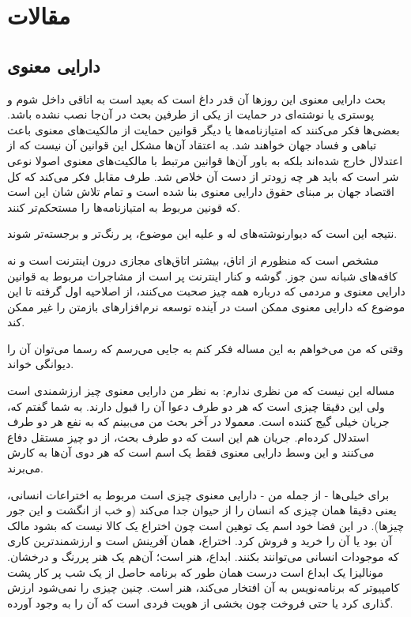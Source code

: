 \chapter{مقالات}
\section{دارایی معنوی}
بحث دارایی معنوی این روزها آن قدر داغ است که بعید است به اتاقی داخل
شوم و پوستری یا نوشته‌ای در حمایت از یکی از طرفین بحث در آن‌جا نصب نشده
باشد. بعضی‌ها فکر می‌کنند که امتیازنامه‌ها یا دیگر قوانین حمایت از
مالکیت‌های معنوی باعث تباهی و فساد جهان خواهند شد. به اعتقاد آن‌ها مشکل
این قوانین آن نیست که از اعتدلال خارج شده‌اند بلکه به باور آن‌ها قوانین
مرتبط با مالکیت‌های معنوی اصولا نوعی شر است که باید هر چه زودتر از دست
آن خلاص شد. طرف مقابل فکر می‌کند که کل اقتصاد جهان بر مبنای حقوق دارایی
معنوی بنا شده است و تمام تلاش شان این است که قونین مربوط به
امتیازنامه‌ها را مستحکم‌تر کنند.

نتیجه این است که دیوارنوشته‌های له و علیه این موضوع، پر رنگ‌تر و
برجسته‌تر شوند.

مشخص است که منظورم از اتاق، بیشتر اتاق‌های مجازی درون اینترنت است و نه
کافه‌های شبانه سن جوز. گوشه و کنار اینترنت پر است از مشاجرات مربوط
به قوانین دارایی معنوی و مردمی که درباره همه چیز صحبت می‌کنند، از
اصلاحیه اول گرفته تا این موضوع که دارایی معنوی ممکن است در آینده توسعه
نرم‌افزارهای بازمتن را غیر ممکن کند.

وقتی که من می‌خواهم به این مساله فکر کنم به جایی می‌رسم که رسما می‌توان
آن را دیوانگی خواند.

مساله این نیست که من نظری ندارم: به نظر من دارایی معنوی چیز ارزشمندی
است ولی این دقیقا چیزی است که هر دو طرف دعوا آن را قبول دارند. به شما
گفتم که، جریان خیلی گیج کننده است. معمولا در آخر بحث من می‌بینم که به
نفع هر دو طرف استدلال کرده‌ام. جریان هم این است که دو طرف بحث، از دو
چیز مستقل دفاع می‌کنند و این وسط دارایی معنوی فقط یک اسم است که هر دوی
آن‌ها به کارش می‌برند.

برای خیلی‌ها - از جمله من - دارایی معنوی چیزی است مربوط به اختراعات
انسانی، یعنی دقیقا همان چیزی که انسان را از حیوان جدا می‌کند (و خب از
انگشت و این جور چیزها). در این فضا خود اسم  یک
توهین است چون اختراع یک کالا نیست که بشود مالک آن بود یا آن را خرید و
فروش کرد. اختراع، همان آفرینش است و ارزشمندترین کاری که موجودات انسانی
می‌توانند بکنند. ابداع، هنر است؛ آن‌هم یک هنر پررنگ و درخشان. مونالیزا
یک ابداع است درست همان طور که برنامه حاصل از یک شب پر کار پشت کامپیوتر
که برنامه‌نویس به آن افتخار می‌کند، هنر است. چنین چیزی را نمی‌شود ارزش
گذاری کرد یا حتی فروخت چون بخشی از هویت فردی است که آن را به وجود
آورده.

